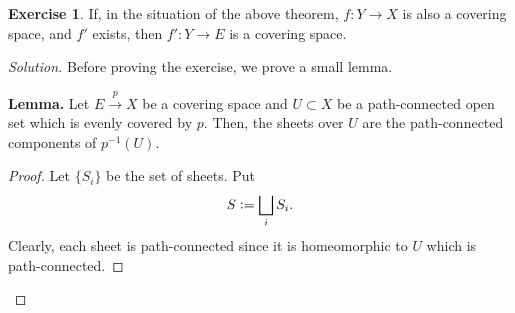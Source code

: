 \documentclass[12pt]{article}
\theoremstyle{definition}
\numberwithin{thm}{section}
\newtheorem{exe}[thm]{Exercise}
\newenvironment{blockquote}
{\begin{mdframed}[skipabove=0pt, skipbelow=0pt, innertopmargin=4pt, innerbottommargin=4pt, bottomline=false,topline=false,rightline=false, linewidth=2pt]}
{\end{mdframed}}
\newenvironment{soln}{\begin{proof}[Solution]}{\end{proof}}
\begin{document}
\begin{exe} \label{exe:alsocoveringspace}
	If, in the situation of the above theorem, $f:Y\to X$ is also a covering space, and $f'$ exists, then $f':Y \to E$ is a covering space. 
\end{exe}
\begin{soln} 
	Before proving the exercise, we prove a small lemma.\\
	\begin{blockquote}
		\textbf{Lemma.} Let $E\overset{p}{\longrightarrow}X$ be a covering space and $U \subset X$ be a path-connected open set which is evenly covered by $p.$ Then, the sheets over $U$ are the path-connected components of $p^{-1}(U).$
		\begin{proof} 
			Let $\{S_i\}$ be the set of sheets. Put 
			\begin{equation*} 
				S \vcentcolon= \bigsqcup_{i} S_i.
			\end{equation*}
			Clearly, each sheet is path-connected since it is homeomorphic to $U$ which is path-connected. 


\end{proof}
\end{blockquote}
\end{soln}
\end{document}

